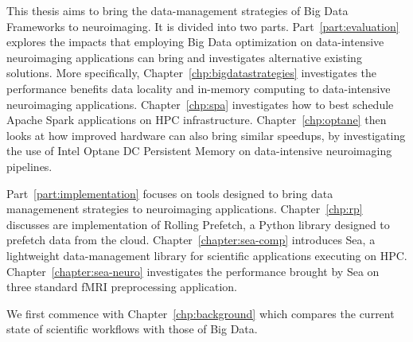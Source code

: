 	This thesis aims to bring the data-management strategies of Big Data
        Frameworks to neuroimaging. It is divided into two parts.
        Part~\ref{part:evaluation} explores the impacts that employing Big
        Data optimization on data-intensive neuroimaging applications can bring
        and investigates alternative existing solutions. More specifically,
        Chapter~\ref{chp:bigdatastrategies} investigates the performance
        benefits data locality and in-memory computing to data-intensive
        neuroimaging applications. Chapter~\ref{chp:spa} investigates how to
        best schedule Apache Spark applications on HPC infrastructure.
        Chapter~\ref{chp:optane} then looks at how improved hardware can also
        bring similar speedups, by investigating the use of Intel Optane DC
        Persistent Memory on data-intensive neuroimaging pipelines.

        Part~\ref{part:implementation} focuses on tools designed to bring
        data managemenent strategies to neuroimaging applications. Chapter~\ref{chp:rp}
        discusses are implementation of Rolling Prefetch, a Python library designed to
        prefetch data from the cloud. Chapter~\ref{chapter:sea-comp} introduces Sea, a lightweight 
        data-management library for scientific applications executing on HPC. Chapter~\ref{chapter:sea-neuro}
        investigates the performance brought by Sea on three standard fMRI preprocessing application.

        We first commence with Chapter~\ref{chp:background} which compares the current state of scientific workflows
        with those of Big Data.


